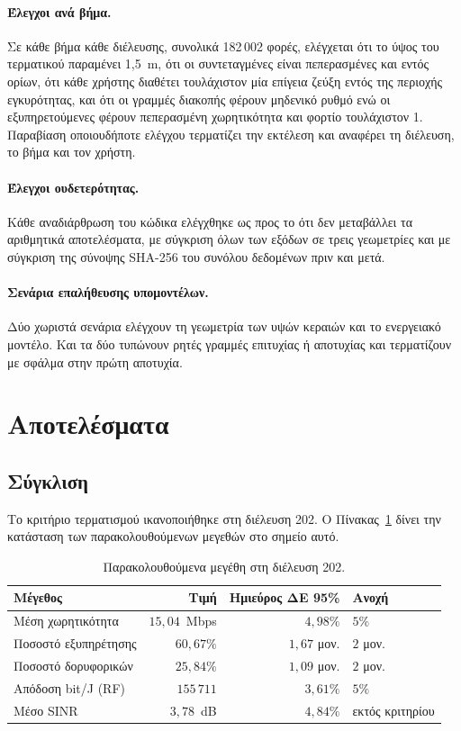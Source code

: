 \documentclass[11pt,a4paper]{article}
\begin{document}
\paragraph{Έλεγχοι ανά βήμα.} Σε κάθε βήμα κάθε διέλευσης, συνολικά
182\,002 φορές, ελέγχεται ότι το ύψος του τερματικού παραμένει 1,5~m, ότι οι
συντεταγμένες είναι πεπερασμένες και εντός ορίων, ότι κάθε χρήστης διαθέτει
τουλάχιστον μία επίγεια ζεύξη εντός της περιοχής εγκυρότητας, και ότι οι
γραμμές διακοπής φέρουν μηδενικό ρυθμό ενώ οι εξυπηρετούμενες φέρουν
πεπερασμένη χωρητικότητα και φορτίο τουλάχιστον 1. Παραβίαση οποιουδήποτε
ελέγχου τερματίζει την εκτέλεση και αναφέρει τη διέλευση, το βήμα και τον
χρήστη.

\paragraph{Έλεγχοι ουδετερότητας.} Κάθε αναδιάρθρωση του κώδικα ελέγχθηκε ως
προς το ότι δεν μεταβάλλει τα αριθμητικά αποτελέσματα, με σύγκριση όλων των
εξόδων σε τρεις γεωμετρίες και με σύγκριση της σύνοψης SHA-256 του συνόλου
δεδομένων πριν και μετά.

\paragraph{Σενάρια επαλήθευσης υπομοντέλων.} Δύο χωριστά σενάρια ελέγχουν τη
γεωμετρία των υψών κεραιών και το ενεργειακό μοντέλο. Και τα δύο τυπώνουν
ρητές γραμμές επιτυχίας ή αποτυχίας και τερματίζουν με σφάλμα στην πρώτη
αποτυχία.

\section{Αποτελέσματα}

\subsection{Σύγκλιση}

Το κριτήριο τερματισμού ικανοποιήθηκε στη διέλευση 202. Ο Πίνακας~\ref{tab:conv}
δίνει την κατάσταση των παρακολουθούμενων μεγεθών στο σημείο αυτό.

\begin{table}[htbp]
\centering\small
\caption{Παρακολουθούμενα μεγέθη στη διέλευση 202.}
\label{tab:conv}
\begin{tabular}{@{}lrrl@{}}
\toprule
Μέγεθος & Τιμή & Ημιεύρος ΔΕ 95\% & Ανοχή \\
\midrule
Μέση χωρητικότητα    & $15{,}04$~Mbps & $4{,}98\%$    & $5\%$ \\
Ποσοστό εξυπηρέτησης & $60{,}67\%$    & $1{,}67$ μον. & $2$ μον. \\
Ποσοστό δορυφορικών  & $25{,}84\%$    & $1{,}09$ μον. & $2$ μον. \\
Απόδοση bit/J (RF)   & $155\,711$     & $3{,}61\%$    & $5\%$ \\
\midrule
Μέσο SINR            & $3{,}78$~dB    & $4{,}84\%$    & εκτός κριτηρίου \\
\bottomrule
\end{tabular}
\end{table}
\end{document}

